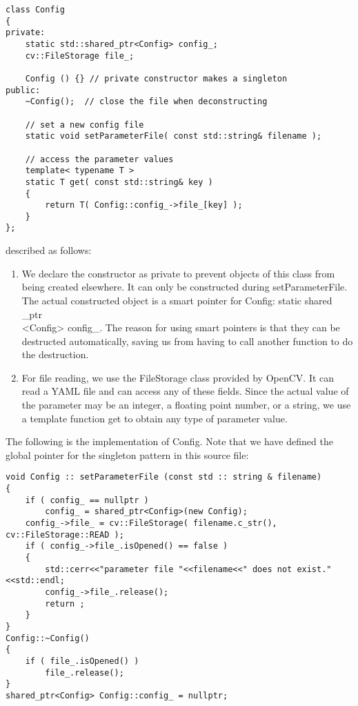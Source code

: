\begin{lstlisting}[language = c ++, caption = slambook/project/0.1/include/myslam/config.h]
class Config
{
private:
	static std::shared_ptr<Config> config_; 
	cv::FileStorage file_;
	
	Config () {} // private constructor makes a singleton
public:
	~Config();  // close the file when deconstructing 
	
	// set a new config file 
	static void setParameterFile( const std::string& filename ); 
	
	// access the parameter values
	template< typename T >
	static T get( const std::string& key )
	{
		return T( Config::config_->file_[key] );
	}
};
\end{lstlisting}

described as follows:
\begin{enumerate}
\item We declare the constructor as private to prevent objects of this class from being created elsewhere. It can only be constructed during setParameterFile. The actual constructed object is a smart pointer for Config: static shared \_ptr \\<Config> config_. The reason for using smart pointers is that they can be destructed automatically, saving us from having to call another function to do the destruction.
\item For file reading, we use the FileStorage class provided by OpenCV. It can read a YAML file and can access any of these fields. Since the actual value of the parameter may be an integer, a floating point number, or a string, we use a template function get to obtain any type of parameter value.
\end{enumerate}

The following is the implementation of Config. Note that we have defined the global pointer for the singleton pattern in this source file:
\begin{lstlisting}[language = c ++, caption = slambook/project/0.1/src/config.cpp]
void Config :: setParameterFile (const std :: string & filename)
{
	if ( config_ == nullptr )
		config_ = shared_ptr<Config>(new Config);
	config_->file_ = cv::FileStorage( filename.c_str(), cv::FileStorage::READ );
	if ( config_->file_.isOpened() == false )
	{
		std::cerr<<"parameter file "<<filename<<" does not exist."<<std::endl;
		config_->file_.release();
		return ;
	}
}
Config::~Config()
{
	if ( file_.isOpened() )
		file_.release();
}
shared_ptr<Config> Config::config_ = nullptr;
\end{lstlisting}

